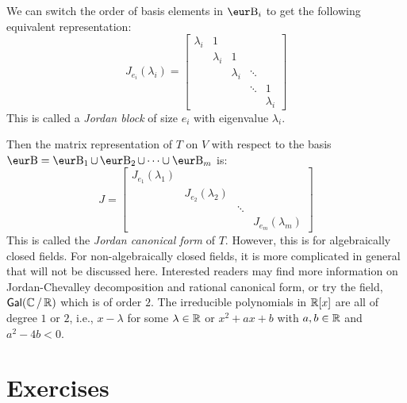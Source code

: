 We can switch the order of basis elements in $\B_i$ to get the following equivalent representation:
\[
  J_{e_i} (\lambda_i) = \begin{bmatrix}
    \lambda_i & 1         &           &        &           \\
              & \lambda_i & 1         &        &           \\
              &           & \lambda_i & \ddots &           \\
              &           &           & \ddots & 1         \\
              &           &           &        & \lambda_i
  \end{bmatrix}
\]
This is called a \emph{Jordan block} of size $e_i$ with eigenvalue $\lambda_i$.

Then the matrix representation of $T$ on $V$ with respect to the basis $\B = \B_1 \cup \B_2 \cup \cdots \cup \B_m$ is:
\[
  J = \begin{bmatrix}
    J_{e_1} (\lambda_1) &                     &        &                     \\
                        & J_{e_2} (\lambda_2) &        &                     \\
                        &                     & \ddots &                     \\
                        &                     &        & J_{e_m} (\lambda_m)
  \end{bmatrix}
\]
This is called the \emph{Jordan canonical form} of $T$. However, this is for algebraically closed fields. For non-algebraically closed fields, it is more complicated in general that will not be discussed here. Interested readers may find more information on Jordan-Chevalley decomposition and rational canonical form, or try the field, $\text{\normalfont\sffamily Gal}(\operatorname{\mathbb{C}} \mathbin{/} \operatorname{\mathbb{R}})$ which is of order $2$. The irreducible polynomials in $\operatorname{\mathbb{R}}[x]$ are all of degree $1$ or $2$, i.e., $x - \lambda$ for some $\lambda \in \operatorname{\mathbb{R}}$ or $x^2 + ax + b$ with $a, b \in \operatorname{\mathbb{R}}$ and $a^2 - 4b < 0$.

\clearpage{}

\section{Exercises}

